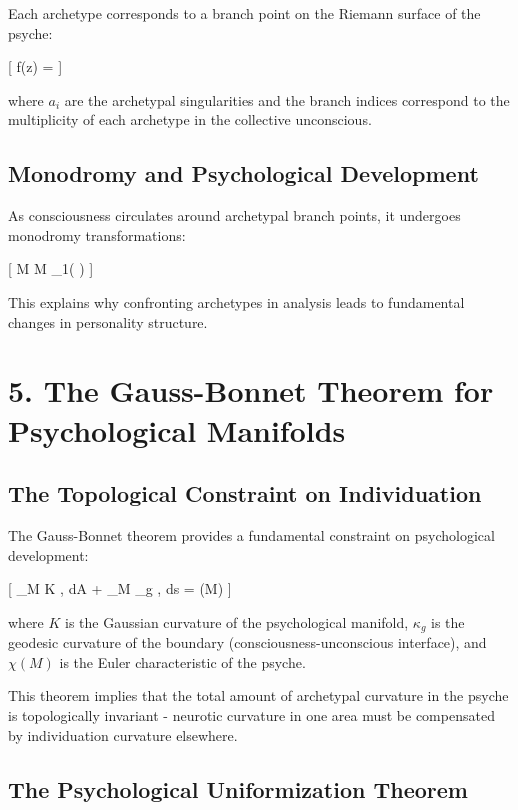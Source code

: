 \documentclass[12pt]{article}
\begin{document}
Each archetype corresponds to a branch point on the Riemann surface of the psyche:

[
f(z) =   \cdots {}
]

where $a_i$ are the archetypal singularities and the branch indices correspond to the multiplicity of each archetype in the collective unconscious.

\subsection*{Monodromy and Psychological Development}

As consciousness circulates around archetypal branch points, it undergoes monodromy transformations:

[
\psi \rightarrow M \psi \quad {} M \in \pi_1( )
]

This explains why confronting archetypes in analysis leads to fundamental changes in personality structure.

\section*{5. The Gauss-Bonnet Theorem for Psychological Manifolds}

\subsection*{The Topological Constraint on Individuation}

The Gauss-Bonnet theorem provides a fundamental constraint on psychological development:

[
\int_M K , dA + \int_{\partial M} \kappa_g , ds = \chi(M)
]

where $K$ is the Gaussian curvature of the psychological manifold, $\kappa_g$ is the geodesic curvature of the boundary (consciousness-unconscious interface), and $\chi(M)$ is the Euler characteristic of the psyche.

This theorem implies that the total amount of archetypal curvature in the psyche is topologically invariant - neurotic curvature in one area must be compensated by individuation curvature elsewhere.

\subsection*{The Psychological Uniformization Theorem}
\end{document}
